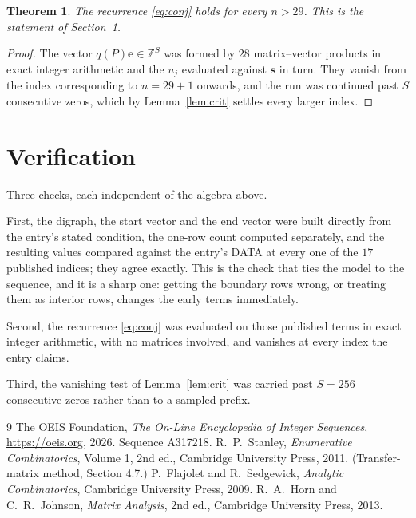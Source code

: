 \documentclass[11pt,a4paper]{article}
\theoremstyle{plain}
\newtheorem{theorem}{Theorem}
\theoremstyle{definition}
\begin{document}
\begin{theorem}
The recurrence \eqref{eq:conj} holds for every $n>29$. This is the statement of
Section~1.
\end{theorem}

\begin{proof}
The vector $q(P)\mathbf{e}\in\mathbb{Z}^{S}$ was formed by $28$ matrix--vector
products in exact integer arithmetic and the $u_j$ evaluated against $\mathbf{s}$ in turn.
They vanish from the index corresponding to $n=29+1$ onwards, and the run was continued
past $S$ consecutive zeros, which by Lemma~\ref{lem:crit} settles every larger index.
\end{proof}

\section{Verification}

Three checks, each independent of the algebra above.

First, the digraph, the start vector and the end vector were built directly from the
entry's stated condition, the one-row count computed separately, and the resulting values
compared against the entry's DATA at every one of the $17$ published indices; they
agree exactly. This is the check that ties the model to the sequence, and it is a sharp one:
getting the boundary rows wrong, or treating them as interior rows, changes the early terms
immediately.

Second, the recurrence \eqref{eq:conj} was evaluated on those published terms in exact
integer arithmetic, with no matrices involved, and vanishes at every index the entry claims.

Third, the vanishing test of Lemma~\ref{lem:crit} was carried past $S=256$ consecutive
zeros rather than to a sampled prefix.

\begin{thebibliography}{9}
 The OEIS Foundation, \emph{The On-Line Encyclopedia of Integer
Sequences}, \url{https://oeis.org}, 2026. Sequence A317218.
 R.~P.~Stanley, \emph{Enumerative Combinatorics}, Volume 1, 2nd ed.,
Cambridge University Press, 2011. (Transfer-matrix method, Section 4.7.)
 P.~Flajolet and R.~Sedgewick, \emph{Analytic Combinatorics}, Cambridge
University Press, 2009.
 R.~A.~Horn and C.~R.~Johnson, \emph{Matrix Analysis}, 2nd ed., Cambridge
University Press, 2013.
\end{thebibliography}
\end{document}
